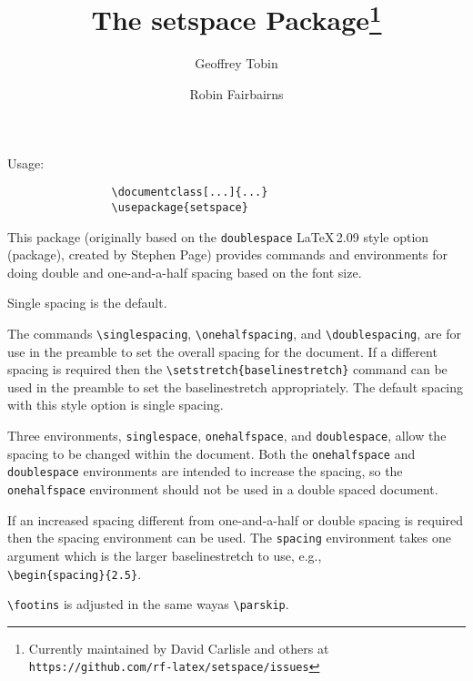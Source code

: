 \documentclass[a4paper]{article}
\title{The setspace Package\thanks{Currently maintained by David Carlisle and others at\\\texttt{https://github.com/rf-latex/setspace/issues}}}
\date{\filedate}
\author{Geoffrey Tobin\and Robin Fairbairns}
\begin{document}
\maketitle

 Usage:

\begin{verbatim}
                \documentclass[...]{...}
                \usepackage{setspace}
\end{verbatim}


         This package (originally based on the \texttt{doublespace} \LaTeX\,2.09 style
         option (package),  created by Stephen Page)
         provides commands and environments for doing double and
         one-and-a-half spacing based on the font size.

         Single spacing is the default.

         The commands \verb|\singlespacing|, \verb|\onehalfspacing|, and
         \verb|\doublespacing|, are for use in the preamble to set the overall
         spacing for the document.  If a different spacing is required then
         the \verb|\setstretch{baselinestretch}| command can be used in the
         preamble to set the baselinestretch appropriately.  The default
         spacing with this style option is single spacing.

         Three environments, \verb|singlespace|, \verb|onehalfspace|,
         and \verb|doublespace|, allow the spacing to be changed
         within the document.  Both the \verb|onehalfspace| and
         \verb|doublespace| environments are intended to increase the
         spacing, so the \verb|onehalfspace| environment should not be
         used in a double spaced document.

         If an increased spacing different from one-and-a-half or
         double spacing is required then the spacing environment can
         be used.  The \verb|spacing| environment takes one argument
         which is the larger baselinestretch to use, e.g.,\\
         \verb|\begin{spacing}{2.5}|.

         \verb|\footins| is adjusted in the same wayas \verb|\parskip|.


\clearpage
\addtolength\textwidth{100pt}
\addtolength\oddsidemargin{-70pt}
\setlength\columnseprule{1pt}
\setlength\columnsep{10pt}
\twocolumn
\tiny

\end{document}
